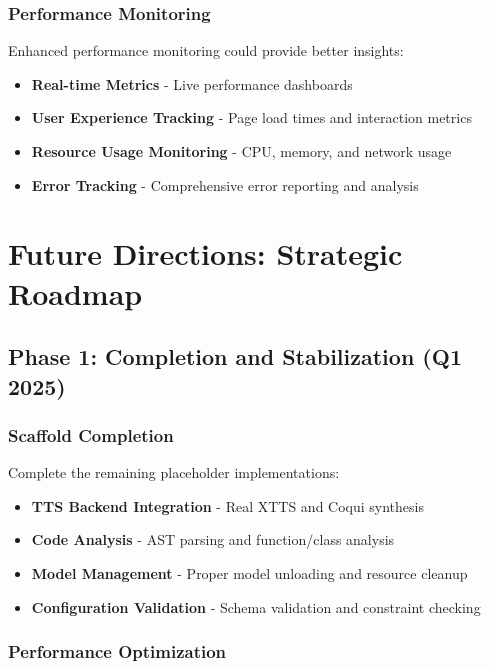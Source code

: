 \documentclass[11pt]{article}
\begin{document}
\subsubsection{Performance Monitoring}

Enhanced performance monitoring could provide better insights:

\begin{itemize}
\item \textbf{Real-time Metrics} - Live performance dashboards
\item \textbf{User Experience Tracking} - Page load times and interaction metrics
\item \textbf{Resource Usage Monitoring} - CPU, memory, and network usage
\item \textbf{Error Tracking} - Comprehensive error reporting and analysis
\end{itemize}

\section{Future Directions: Strategic Roadmap}

\subsection{Phase 1: Completion and Stabilization (Q1 2025)}

\subsubsection{Scaffold Completion}

Complete the remaining placeholder implementations:

\begin{itemize}
\item \textbf{TTS Backend Integration} - Real XTTS and Coqui synthesis
\item \textbf{Code Analysis} - AST parsing and function/class analysis
\item \textbf{Model Management} - Proper model unloading and resource cleanup
\item \textbf{Configuration Validation} - Schema validation and constraint checking
\end{itemize}

\subsubsection{Performance Optimization}
\end{document}
